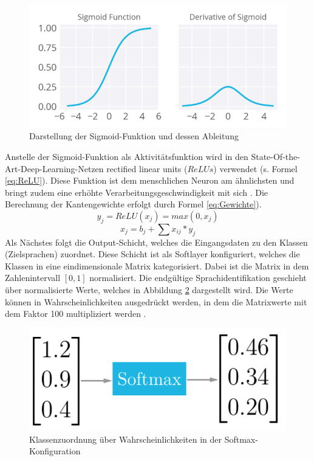 \begin{figure}[h!]
	\centering
	\includegraphics[width=1.0\linewidth]{images/sigmund}
	\caption{Darstellung der Sigmoid-Funktion und dessen Ableitung \cite{Kulbear.2017}} %
	\label{fig:features11.0}
\end{figure}
Anstelle der Sigmoid-Funktion als Aktivitätsfunktion wird in den State-Of-the-Art-Deep-Learning-Netzen rectified linear units ($ReLUs$) verwendet (s. Formel \ref{eq:ReLU}). Diese Funktion ist dem menschlichen Neuron am ähnlichsten und bringt zudem eine erhöhte Verarbeitungsgeschwindigkeit mit sich \cite{zeiler.2013}. Die Berechnung der Kantengewichte erfolgt durch Formel \ref{eq:Gewichte}).
\begin{equation}
y_{j} = ReLU(x_{j}) = max(0,x_{j}) 
\label{eq:ReLU}
\end{equation}
\begin{equation}
x_{ j } = b_{ j } + \sum{ }{ }{ x_{ ij } * y_{j}}
\label{eq:Gewichte}
\end{equation}
Als Nächstes folgt die Output-Schicht, welches die Eingangsdaten zu den Klassen (Zielsprachen) zuordnet. Diese Schicht ist als Softlayer konfiguriert, welches die Klassen in eine eindimensionale Matrix kategorisiert. Dabei ist die Matrix in dem Zahlenintervall $[0,1]$ normalisiert. Die endgültige Sprachidentifikation geschieht über normalisierte Werte, welches in Abbildung \ref{fig:soft} dargestellt wird. Die Werte können in Wahrscheinlichkeiten ausgedrückt werden, in dem die Matrixwerte mit dem Faktor 100 multipliziert werden \cite{Kulbear.2017}.
\begin{figure}[h!]
	\centering
	\includegraphics[width=0.7\linewidth]{images/softmax}
	\caption{Klassenzuordnung über Wahrscheinlichkeiten in der Softmax-Konfiguration \cite{Kulbear.2017}} %
	\label{fig:soft}
\end{figure}
